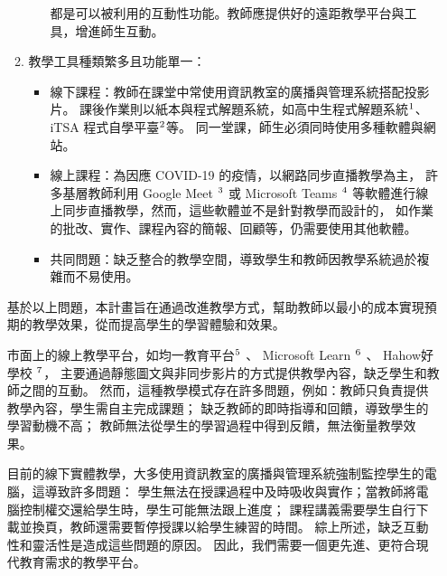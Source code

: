 \documentclass[12pt]{article}
\begin{document}
\begin{enumerate}
\begin{enumerate}
\begin{itemize}
          都是可以被利用的互動性功能。教師應提供好的遠距教學平台與工具，增進師生互動\cite{ref4}。
        \end{itemize}
      \item 教學工具種類繁多且功能單一：
        \begin{itemize}
          \item 線下課程：教師在課堂中常使用資訊教室的廣播與管理系統搭配投影片。
          課後作業則以紙本與程式解題系統，如高中生程式解題系統$\footnote{https://zerojudge.tw/}$、
           iTSA 程式自學平臺$\footnote{https://e-tutor.itsa.org.tw/e-Tutor/}$等。
          同一堂課，師生必須同時使用多種軟體與網站。
          \item 線上課程：為因應 COVID-19 的疫情，以網路同步直播教學為主，
          許多基層教師利用 Google Meet $\footnote{https://meet.google.com/}$
          或 Microsoft Teams $\footnote{https://www.microsoft.com/zh-tw/microsoft-teams/}$
          等軟體進行線上同步直播教學，然而，這些軟體並不是針對教學而設計的，
          如作業的批改、實作、課程內容的簡報、回顧等，仍需要使用其他軟體。
          \item 共同問題：缺乏整合的教學空間，導致學生和教師因教學系統過於複雜而不易使用。
        \end{itemize}
    \end{enumerate}
    \par 基於以上問題，本計畫旨在通過改進教學方式，幫助教師以最小的成本實現預期的教學效果，從而提高學生的學習體驗和效果。
    
    \par 市面上的線上教學平台，如均一教育平台$\footnote{https://www.junyiacademy.org/}$
    、 Microsoft Learn $\footnote{https://learn.microsoft.com/zh-tw/}$
    、 Hahow好學校 $\footnote{https://hahow.in/}$，
    主要通過靜態圖文與非同步影片的方式提供教學內容，缺乏學生和教師之間的互動。
    然而，這種教學模式存在許多問題，例如：教師只負責提供教學內容，學生需自主完成課題；
    缺乏教師的即時指導和回饋，導致學生的學習動機不高；
    教師無法從學生的學習過程中得到反饋，無法衡量教學效果\cite{ref4}。
    
    \par 目前的線下實體教學，大多使用資訊教室的廣播與管理系統強制監控學生的電腦，這導致許多問題：
    學生無法在授課過程中及時吸收與實作；當教師將電腦控制權交還給學生時，學生可能無法跟上進度；
    課程講義需要學生自行下載並換頁，教師還需要暫停授課以給學生練習的時間。
    綜上所述，缺乏互動性和靈活性是造成這些問題的原因。
    因此，我們需要一個更先進、更符合現代教育需求的教學平台。


\end{enumerate}
\end{document}
